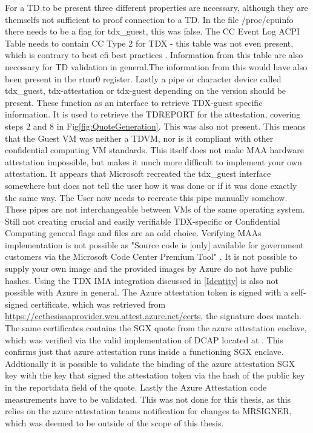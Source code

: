 For a TD to be present three different properties are necessary, although they are themselfs not sufficient to proof connection to a TD. In the file /proc/cpuinfo there needs to be a flag for tdx\_guest, this was false. The CC Event Log ACPI Table needs to contain CC Type 2 for TDX - this table was not even present, which is contrary to best efi best practices \cite{uefi_forum_inc_acpi_docu_2022}. Information from this table are also necessary for TD validation in general.The information from this would have also been present in the rtmr0 register. Lastly a pipe or character device called tdx\_guest, tdx-attestation or tdx-guest depending on the version should be present. These function as an interface to retrieve TDX-guest specific information\cite{linux_kernel_development_community_tdx_2024}. It is used to retrieve the TDREPORT for the attestation, covering steps 2 and 8 in Fig\ref{fig:QuoteGeneration}.  This was also not present. This means that the Guest VM was neither a TDVM, nor is it compliant with other confidential computing VM standards. This itself does not make MAA hardware attestation impossible, but makes it much more difficult to implement your own attestation. It appears that Microsoft recreated the tdx\_guest interface somewhere but does not tell the user how it was done or if it was done exactly the same way. The User now needs to recreate this pipe manually somehow. These pipes are not interchangeable between VMs of the same operating system. Still not creating crucial and easily verifiable TDX-specific or Confidential Computing general flags and files are an odd choice.
Verifying MAAs implementation is not possible as "Source code is [only] available for government customers via the Microsoft Code Center Premium Tool" \cite{dan_mabee_azure_attestation_2023}. It is not possible to supply your own image and the provided images by Azure do not have public hashes. Using the TDX IMA integration discussed in \ref{Identity} is also not possible with Azure in general.
The Azure attestation token is signed with a self-signed certificate, which was retrieved from \url{https://ccthesisaaprovider.weu.attest.azure.net/certs}, the signature does match. The same certificates contains the SGX quote from the azure attestation enclave, which was verified via the valid implementation of DCAP located at \cite{azure_samples}. This confirms just that azure attestation runs inside a functioning SGX enclave. Addtionally it is possible to validate the binding of the azure attestation SGX key with the key that signed the attestation token via the hash of the public key in the reportdata field of the quote. Lastly the Azure Attestation code measurements have to be validated. This was not done for this thesis, as this relies on the azure attestation teams notification for changes to MRSIGNER, which was deemed to be outside of the scope of this thesis.

